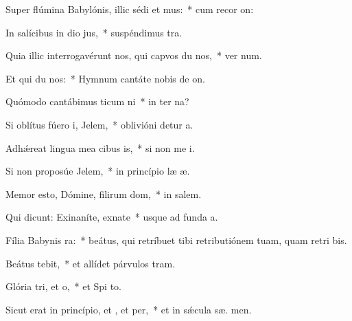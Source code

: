 \item Super flúmina Babylónis, illic sédi et mus:~* cum recor on:
\item In salícibus in dio jus,~* suspéndimus  tra.
\item Quia illic interrogavérunt nos, qui capvos du nos,~* ver num.
\item Et qui du nos:~* Hymnum cantáte nobis de  on.
\item Quómodo cantábimus ticum ni~* in ter na?
\item Si oblítus fúero i, Jelem,~* oblivióni detur  a.
\item Adhǽreat lingua mea cibus is,~* si non me i.
\item Si non proposúe Jelem,~* in princípio læ æ.
\item Memor esto, Dómine, filirum dom,~* in  salem.
\item Qui dicunt: Exinaníte, exnate~* usque ad funda  a.
\item Fília Babynis ra:~* beátus, qui retríbuet tibi retributiónem tuam, quam retri bis.
\item Beátus  tebit,~* et allídet párvulos   tram.
\item Glória tri, et o,~* et Spi to.
\item Sicut erat in princípio, et , et per,~* et in sǽcula sæ. men.
